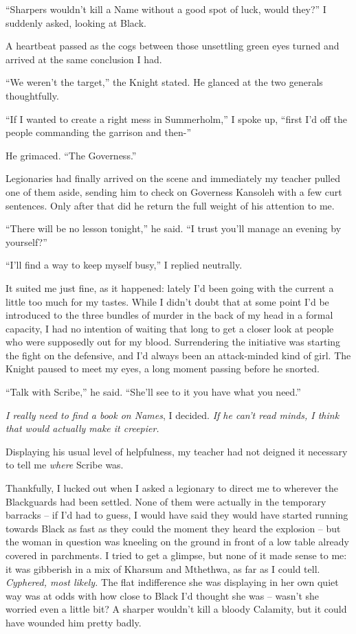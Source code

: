 \documentclass[12pt, openany]{book}
\begin{document}
“Sharpers wouldn’t kill a Name without a good spot of luck, would they?” I suddenly asked, looking at Black.

A heartbeat passed as the cogs between those unsettling green eyes turned and arrived at the same conclusion I had.

“We weren’t the target,” the Knight stated. He glanced at the two generals thoughtfully.

“If I wanted to create a right mess in Summerholm,” I spoke up, “first I’d off the people commanding the garrison and then-”

He grimaced. “The Governess.”

Legionaries had finally arrived on the scene and immediately my teacher pulled one of them aside, sending him to check on Governess Kansoleh with a few curt sentences. Only after that did he return the full weight of his attention to me.

“There will be no lesson tonight,” he said. “I trust you’ll manage an evening by yourself?”

“I’ll find a way to keep myself busy,” I replied neutrally.

It suited me just fine, as it happened: lately I’d been going with the current a little too much for my tastes. While I didn’t doubt that at some point I’d be introduced to the three bundles of murder in the back of my head in a formal capacity, I had no intention of waiting that long to get a closer look at people who were supposedly out for my blood. Surrendering the initiative was starting the fight on the defensive, and I’d always been an attack-minded kind of girl. The Knight paused to meet my eyes, a long moment passing before he snorted.

“Talk with Scribe,” he said. “She’ll see to it you have what you need.”

\textit{I really need to find a book on Names}, I decided.\textit{ If he can’t read minds, I think that would actually make it creepier.}

Displaying his usual level of helpfulness, my teacher had not deigned it necessary to tell me \textit{where} Scribe was.

Thankfully, I lucked out when I asked a legionary to direct me to wherever the Blackguards had been settled. None of them were actually in the temporary barracks – if I’d had to guess, I would have said they would have started running towards Black as fast as they could the moment they heard the explosion – but the woman in question was kneeling on the ground in front of a low table already covered in parchments. I tried to get a glimpse, but none of it made sense to me: it was gibberish in a mix of Kharsum and Mthethwa, as far as I could tell. \textit{Cyphered, most likely.} The flat indifference she was displaying in her own quiet way was at odds with how close to Black I’d thought she was – wasn’t she worried even a little bit? A sharper wouldn’t kill a bloody Calamity, but it could have wounded him pretty badly.
\end{document}
